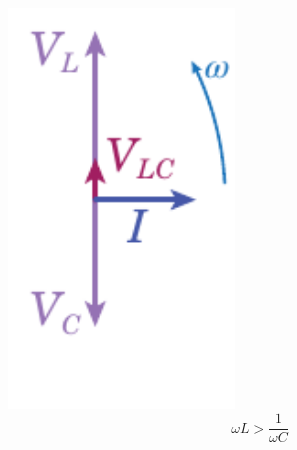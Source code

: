 \begin{minipage}{0.49\textwidth}
	\begin{center}
		\includegraphics[width=0.45\textwidth]{images/chp11/chp11fasoriLC1.pdf}
		$$\omega L>\frac{1}{\omega C}$$
	\end{center}
\end{minipage}
